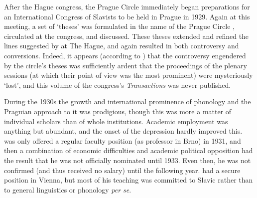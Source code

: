 After the Hague congress, the Prague Circle immediately began
preparations for an {International Congress of Slavists} to be held in
Prague in 1929. Again at this meeting, a set of `theses' was
formulated in the name of the Prague Circle
\citep{theses29:prague.slavic}, circulated at the congress, and
discussed. These theses extended and refined the lines suggested by
{\Jakobson} at The Hague, and again resulted in both controversy and
conversions. Indeed, it appears (according to
\citealt{jakobson65:terms}) that the controversy engendered by the
circle's theses was sufficiently ardent that the proceedings of the
plenary sessions (at which their point of view was the most prominent)
were mysteriously `lost', and this volume of the congress's
\textsl{Transactions} was never published.

During the 1930s the growth and international prominence of phonology
and the Praguian approach to it was prodigious, though this was more a
matter of individual scholars than of whole institutions. Academic
employment was anything but abundant, and the onset of the depression
hardly improved this. {\Jakobson} was only offered a {regular} faculty
position (as professor in Brno) in 1931, and then a combination of
economic difficulties and academic political opposition had the result
that he was not officially nominated until 1933. Even then, he was not
confirmed (and thus received no salary) until the following
year. {\Trubetzkoy} had a secure position in Vienna, but most of his
teaching was committed to Slavic rather than to general linguistics or
phonology \emph{per se}.

